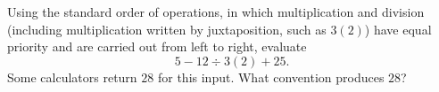 Using the standard order of operations, in which multiplication and division (including multiplication written by juxtaposition, such as $3(2)$) have equal priority and are carried out from left to right, evaluate
\[
5-12\div 3(2)+25 .
\]
Some calculators return $28$ for this input. What convention produces $28$?
